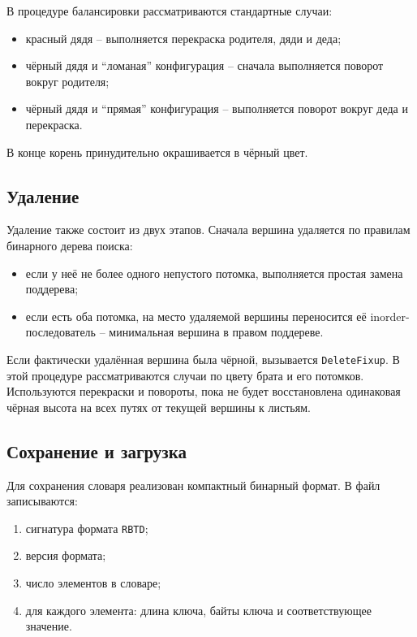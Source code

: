 В процедуре балансировки рассматриваются стандартные случаи:
\begin{itemize}
\item красный дядя -- выполняется перекраска родителя, дяди и деда;
\item чёрный дядя и \enquote{ломаная} конфигурация -- сначала выполняется поворот вокруг родителя;
\item чёрный дядя и \enquote{прямая} конфигурация -- выполняется поворот вокруг деда и перекраска.
\end{itemize}

В конце корень принудительно окрашивается в чёрный цвет.

\subsection{Удаление}

Удаление также состоит из двух этапов. Сначала вершина удаляется по правилам бинарного дерева поиска:
\begin{itemize}
\item если у неё не более одного непустого потомка, выполняется простая замена поддерева;
\item если есть оба потомка, на место удаляемой вершины переносится её inorder-последователь -- минимальная вершина в правом поддереве.
\end{itemize}

Если фактически удалённая вершина была чёрной, вызывается \texttt{DeleteFixup}. В этой процедуре рассматриваются случаи по цвету брата и его потомков. Используются перекраски и повороты, пока не будет восстановлена одинаковая чёрная высота на всех путях от текущей вершины к листьям.

\subsection{Сохранение и загрузка}

Для сохранения словаря реализован компактный бинарный формат. В файл записываются:
\begin{enumerate}
\item сигнатура формата \texttt{RBTD};
\item версия формата;
\item число элементов в словаре;
\item для каждого элемента: длина ключа, байты ключа и соответствующее значение.
\end{enumerate}

